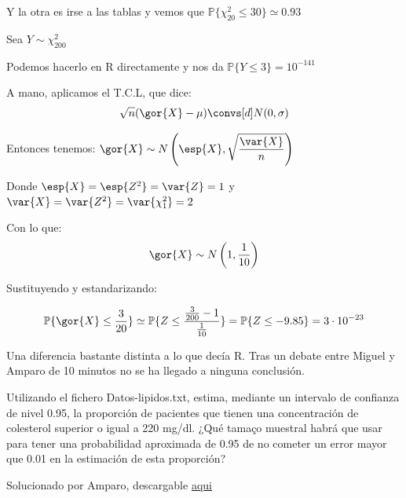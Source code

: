 \begin{problem}[3]
Y la otra es irse a las tablas y vemos que $\mathbb{P}\{\chi^2_{20} \leq 30\} \simeq 0.93$

\spart Sea $Y \sim \chi_{200}^2$ 

Podemos hacerlo en R directamente y nos da $\mathbb{P}\{Y\leq 3\} = 10 ^{-141}$

A mano, aplicamos el T.C.L, que dice:
\[\sqrt{n}(\gor{X} - \mu) \convs[d] N(0,\sigma)  \]

Entonces tenemos: $\gor{X} \sim N\left(\esp{X},\displaystyle \sqrt{\frac{\var{X}}{n}}\right)$

Donde $\esp{X} = \esp{Z^2} = \var{Z} = 1$ y $\var{X} = \var{Z^2} = \var{\chi_1^2} = 2$

Con lo que:
\[\gor{X} \sim N\left(1,\frac{1}{10}\right)\]

Sustituyendo y estandarizando:

\[
\mathbb{P}\{\gor{X}\leq\frac{3}{20} \} \simeq \mathbb{P} \{Z\leq \frac{\frac{3}{200} - 1}{\frac{1}{10}} \} = \mathbb{P} \{Z\leq -9.85\} = 3 \cdot 10^{-23}
\]

Una diferencia bastante distinta a lo que decía R. Tras un debate entre Miguel y Amparo de 10 minutos no se ha llegado a ninguna conclusión.
\end{problem}

\begin{problem}[4]
\ppart Utilizando el fichero Datos-lipidos.txt, estima, mediante un intervalo de confianza de nivel
0.95, la proporción de pacientes que tienen una concentración de colesterol superior o igual a
220 mg/dl. ¿Qué tamaço muestral habrá que usar para tener una probabilidad aproximada de 0.95 de no cometer un error mayor que 0.01 en la estimación de esta proporción?

\ppart
\solution
Solucionado por Amparo, descargable 
\href{http://www.uam.es/personal_pdi/ciencias/abaillo/MatEstI/T4DatosLipidos.pdf}{aqui}
\end{problem}

